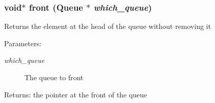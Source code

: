\subsubsection{\setlength{\rightskip}{0pt plus 5cm}void$\ast$ front (\bf{Queue} $\ast$ {\em which\_\-queue})}\label{queue_8c_afbf7ed14373984ccc9fa2f9ac776b7a}


Returns the element at the head of the queue without removing it \begin{Desc}
\item[Parameters:]
\begin{description}
\item[{\em which\_\-queue}]The queue to front \end{description}
\end{Desc}
\begin{Desc}
\item[Returns:]the pointer at the front of the queue \end{Desc}
